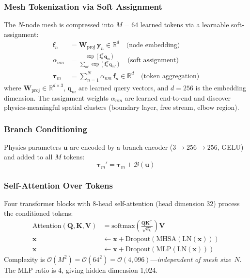 \documentclass[journal]{IEEEtran}
\begin{document}
\subsubsection{Mesh Tokenization via Soft Assignment}
The $N$-node mesh is compressed into $M = 64$ learned tokens via a learnable soft-assignment:
\begin{align}
\bm{f}_n &= \bm{W}_\text{proj}\,\bm{y}_n \in \mathbb{R}^{d} \quad\text{(node embedding)} \label{eq:node_embed}\\
\alpha_{nm} &= \frac{\exp(\bm{f}_n^\top \bm{q}_m)}{\sum_{m'}\exp(\bm{f}_n^\top \bm{q}_{m'})} \quad\text{(soft assignment)} \label{eq:soft_assign}\\
\bm{\tau}_m &= \sum_{n=1}^{N} \alpha_{nm}\,\bm{f}_n \in \mathbb{R}^{d} \quad\text{(token aggregation)} \label{eq:token_agg}
\end{align}
where $\bm{W}_\text{proj} \in \mathbb{R}^{d \times 3}$, $\bm{q}_m$ are learned query vectors, and $d = 256$ is the embedding dimension. The assignment weights $\alpha_{nm}$ are learned end-to-end and discover physics-meaningful spatial clusters (boundary layer, free stream, elbow region).

\subsubsection{Branch Conditioning}
Physics parameters $\bm{u}$ are encoded by a branch encoder ($3 \to 256 \to 256$, GELU) and added to all $M$ tokens:
\begin{equation}
\bm{\tau}_m' = \bm{\tau}_m + \mathcal{B}(\bm{u})
\label{eq:branch_cond}
\end{equation}

\subsubsection{Self-Attention Over Tokens}
Four transformer blocks with 8-head self-attention (head dimension 32) process the conditioned tokens:
\begin{align}
\text{Attention}(\bm{Q},\bm{K},\bm{V}) &= \text{softmax}\!\left(\frac{\bm{Q}\bm{K}^\top}{\sqrt{d_k}}\right)\bm{V} \label{eq:attn} \\
\bm{x} &\leftarrow \bm{x} + \text{Dropout}(\text{MHSA}(\text{LN}(\bm{x}))) \label{eq:res_attn} \\
\bm{x} &\leftarrow \bm{x} + \text{Dropout}(\text{MLP}(\text{LN}(\bm{x}))) \label{eq:res_mlp}
\end{align}
Complexity is $\mathcal{O}(M^2) = \mathcal{O}(64^2) = \mathcal{O}(4{,}096)$---\emph{independent of mesh size}~$N$. The MLP ratio is 4, giving hidden dimension 1,024.
\end{document}
